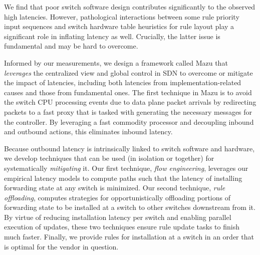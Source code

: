 We find that poor switch software design contributes significantly to
 the observed high latencies. However, pathological interactions between
 some rule priority input sequences and switch hardware table  heuristics for
 rule layout play a significant  role in inflating latency as well.
 Crucially, the latter issue is  fundamental and may be hard to overcome.


 Informed by our measurements, we
 design a framework called Mazu that {\em leverages} the centralized view
 and global control in SDN to overcome or mitigate the impact of
 latencies, including both latencies from implementation-related causes
 and those from fundamental ones. %
 The first technique in Mazu is to avoid the switch CPU processing
 events due to data plane packet arrivals by redirecting packets to a
 fast proxy that is tasked with generating the necessary messages for the
 controller. By leveraging a fast commodity processor and decoupling
 inbound and outbound actions, this eliminates inbound latency.
 
Because
 outbound latency is intrinsically linked to switch
 software and hardware,
 we develop techniques that can be used (in
 isolation or together) for systematically {\em mitigating} it. Our
 first technique, {\em flow engineering}, leverages our empirical latency models to  compute paths such
 that the latency of installing forwarding state at any switch is minimized. Our second
 technique, {\em
   rule offloading}, computes strategies for opportunistically
 offloading portions of
 forwarding state to be installed at a switch to other switches
 downstream from it. By virtue of reducing installation latency per switch and enabling parallel execution of updates,
 these two techniques ensure rule update tasks to
 finish much faster. Finally, we provide rules for installation at a switch in an
 order that is optimal for the vendor in question. 

